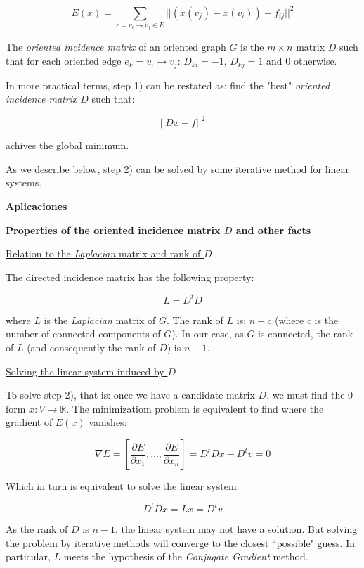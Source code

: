 \documentclass[a4paper,11pt]{article}
\begin{document}
$$E(x) = \sum_{e=v_i \rightarrow v_j \in E} ||(x(v_j) - x(v_i)) - f_{ij}||^2$$

\bigskip

The \textit{oriented incidence matrix} of an oriented graph $G$ is the $m 
\times n$ matrix $D$ such that for each oriented edge $e_k=v_i \rightarrow 
v_j$: $D_{ki} = -1$, $D_{kj} = 1$ and $0$ otherwise.

\bigskip

In more practical terms, step 1) can be restated as: find the "best" 
\textit{oriented incidence matrix} $D$ such that: 

$$||Dx-f||^2$$

achives the global minimum.

\bigskip

As we describe below, step 2) can be solved by some iterative method for 
linear systems.

\bigskip

\textbf{Aplicaciones}

\bigskip

\textbf{Properties of the oriented incidence matrix $D$ and other facts}

\bigskip

\underline{Relation to the \textit{Laplacian} matrix and rank of $D$}

\bigskip

The directed incidence matrix has the following property:

$$L = D^t D$$

where $L$ is the \textit{Laplacian} matrix of $G$. The rank of 
$L$ is: $n-c$ (where $c$ is the number of connected components of $G$). 
In our case, as $G$ is connected, the rank of $L$ (and consequently the 
rank of $D$) is $n-1$.

\bigskip

\underline{Solving the linear system induced by $D$}

\bigskip

To solve step 2), that is: once we have a candidate matrix $D$, we must 
find the 0-form $x: V \rightarrow \mathbb{R}$. The minimizatiom problem 
is equivalent to find where the gradient of $E(x)$ vanishes:
 
$$\nabla E = [\frac{\partial E}{\partial x_1}, \dots, \frac{\partial 
E}{\partial x_n}] = D^tDx-D^tv=0$$

Which in turn is equivalent to solve the linear system:

$$D^tDx = Lx = D^tv$$

As the rank of $D$ is $n-1$, the linear system may not have a solution. 
But solving the problem by iterative methods will converge to the 
closest ``possible" guess. In particular, $L$ meets the hypothesis of 
the \textit{Conjugate Gradient} method.
\end{document}
